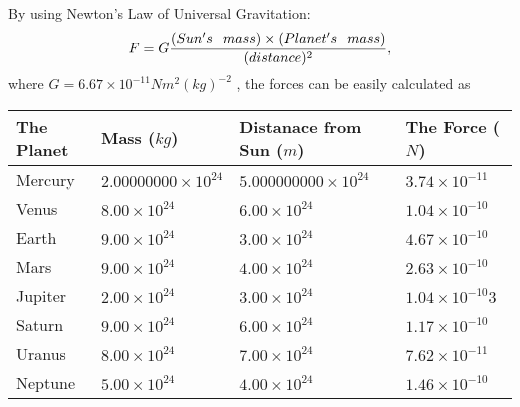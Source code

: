 \documentclass[12pt]{article}
\begin{document}
 
 
 
 
 
\noindent{}

By using Newton's Law of Universal Gravitation:
\[
F=G \frac{(Sun's \hspace{0.1in} mass) \times (Planet's \hspace{0.1in} mass)} { (distance)^2},
\]
where
$ G= %
6.67 \times 10^{-11} N m^{2}(kg)^{-2}$ , the forces can be easily calculated as
 
\vspace{0.2in}
 
 
\begin{tabular}{|l|l|l|l|}
\hline
The Planet & Mass ($kg$) & Distanace from Sun ($m$) & The Force ($N$)\\
\hline
Mercury  &
           $ %
2.00000000 \times 10^{24}  $   &
             $ %
5.000000000 \times 10^{24}$    & $ %
3.74 \times 10^{-11} $
\\  \hline
Venus    &
           $  %
8.00 \times 10^{24}  $     &
             $ %
6.00 \times 10^{24} $    & $ %
1.04 \times 10^{-10} $
\\  \hline
Earth    &
           $  %
9.00 \times 10^{24}$     &
             $ %
3.00 \times 10^{24} $    & $ %
4.67 \times 10^{-10} $
\\   \hline
Mars     &
           $  %
9.00 \times 10^{24} $     &
             $ %
4.00 \times 10^{24}$    & $ %
2.63 \times 10^{-10} $
\\   \hline
Jupiter  &
           $  %
2.00 \times 10^{24}  $    &
             $ %
3.00 \times 10^{24} $    & $ %
1.04 \times 10^{-10}3 $
\\  \hline
Saturn   &
           $  %
9.00 \times 10^{24}   $    &
             $ %
6.00 \times 10^{24}  $    & $ %
1.17 \times 10^{-10} $
\\  \hline
Uranus   &
           $  %
8.00 \times 10^{24} $    &
             $ %
7.00 \times 10^{24}$    & $ %
7.62 \times 10^{-11} $
\\  \hline
Neptune  &
           $  %
5.00 \times 10^{24}  $    &
             $ %
4.00 \times 10^{24} $    & $ %
1.46 \times 10^{-10} $
\\  \hline
 
\end{tabular}
 
 
 
 
  
\vspace{0.2in}
  
\end{document}
